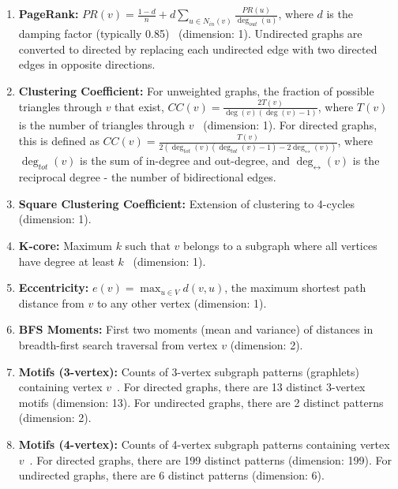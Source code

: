 \documentclass{article}
\begin{document}
\begin{enumerate}
        \item \textbf{PageRank:} $PR(v) = \frac{1-d}{n}+ d\sum_{u\in N_{in}(v)}\frac{PR(u)}{\deg_{out}(u)}$, where $d$ is the damping factor (typically 0.85)~\citep{page1999pagerank} (dimension: 1). Undirected graphs are converted to directed by replacing each undirected edge with two directed edges in opposite directions.

        \item \textbf{Clustering Coefficient:} For unweighted graphs, the fraction of possible triangles through $v$ that exist, $CC(v) = \frac{2T(v)}{\deg(v)(\deg(v)-1)}$, where $T(v)$ is the number of triangles through $v$~\citep{watts1998collective} (dimension: 1). For directed graphs, this is defined as $CC(v) = \frac{T(v)}{2(\deg_{tot}(v)(\deg_{tot}(v)-1)-2\deg_{\leftrightarrow}(v))}$, where $\deg_{tot}(v)$ is the sum of in-degree and out-degree, and $\deg_{\leftrightarrow}(v)$ is the reciprocal degree - the number of bidirectional edges.

        \item \textbf{Square Clustering Coefficient:} Extension of clustering to 4-cycles~\citep{lind2005cycles} (dimension: 1).

        \item \textbf{K-core:} Maximum $k$ such that $v$ belongs to a subgraph where all vertices have degree at least $k$~\citep{seidman1983network} (dimension: 1).

        \item \textbf{Eccentricity:} $e(v) = \max_{u \in V}d(v,u)$, the maximum shortest path distance from $v$ to any other vertex (dimension: 1).

        \item \textbf{BFS Moments:} First two moments (mean and variance) of distances in breadth-first search traversal from vertex $v$ (dimension: 2).

        \item \textbf{Motifs (3-vertex):} Counts of 3-vertex subgraph patterns (graphlets) containing vertex $v$~\citep{milo2002network}. For directed graphs, there are 13 distinct 3-vertex motifs (dimension: 13). For undirected graphs, there are 2 distinct patterns (dimension: 2).

        \item \textbf{Motifs (4-vertex):} Counts of 4-vertex subgraph patterns containing vertex $v$~\citep{milo2002network}. For directed graphs, there are 199 distinct patterns (dimension: 199). For undirected graphs, there are 6 distinct patterns (dimension: 6).


\end{enumerate}
\end{document}
